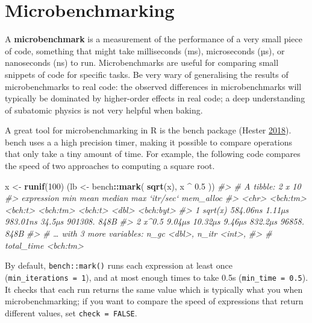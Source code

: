 \documentclass[]{book}
\newenvironment{Shaded}{\begin{snugshade}}{\end{snugshade}}
\newcommand{\CommentTok}[1]{\textcolor[rgb]{0.37,0.37,0.37}{\textit{#1}}}
\newcommand{\DecValTok}[1]{\textcolor[rgb]{0.06,0.06,0.06}{#1}}
\newcommand{\FloatTok}[1]{\textcolor[rgb]{0.06,0.06,0.06}{#1}}
\newcommand{\KeywordTok}[1]{\textcolor[rgb]{0.27,0.27,0.27}{\textbf{#1}}}
\newcommand{\NormalTok}[1]{#1}
\newcommand{\OperatorTok}[1]{\textcolor[rgb]{0.43,0.43,0.43}{\textbf{#1}}}
\newcommand{\StringTok}[1]{\textcolor[rgb]{0.5,0.5,0.5}{#1}}
\begin{document}
\hypertarget{microbenchmarking}{%
\section{Microbenchmarking}\label{microbenchmarking}}


A \textbf{microbenchmark} is a measurement of the performance of a very small piece of code, something that might take milliseconds (ms), microseconds (µs), or nanoseconds (ns) to run. Microbenchmarks are useful for comparing small snippets of code for specific tasks. Be very wary of generalising the results of microbenchmarks to real code: the observed differences in microbenchmarks will typically be dominated by higher-order effects in real code; a deep understanding of subatomic physics is not very helpful when baking.

A great tool for microbenchmarking in R is the bench package (Hester \protect\hyperlink{ref-bench}{2018}). bench uses a a high precision timer, making it possible to compare operations that only take a tiny amount of time. For example, the following code compares the speed of two approaches to computing a square root.

\begin{Shaded}
\begin{Highlighting}[]
\NormalTok{x <-}\StringTok{ }\KeywordTok{runif}\NormalTok{(}\DecValTok{100}\NormalTok{)}
\NormalTok{(lb <-}\StringTok{ }\NormalTok{bench}\OperatorTok{::}\KeywordTok{mark}\NormalTok{(}
  \KeywordTok{sqrt}\NormalTok{(x),}
\NormalTok{  x }\OperatorTok{^}\StringTok{ }\FloatTok{0.5}
\NormalTok{))}
\CommentTok{#> # A tibble: 2 x 10}
\CommentTok{#>   expression      min    mean   median     max `itr/sec` mem_alloc}
\CommentTok{#>   <chr>      <bch:tm> <bch:t> <bch:tm> <bch:t>     <dbl> <bch:byt>}
\CommentTok{#> 1 sqrt(x)    584.06ns  1.11µs 983.01ns  34.5µs   901308.      848B}
\CommentTok{#> 2 x^0.5        9.04µs 10.32µs   9.46µs 832.2µs    96858.      848B}
\CommentTok{#> # … with 3 more variables: n_gc <dbl>, n_itr <int>,}
\CommentTok{#> #   total_time <bch:tm>}
\end{Highlighting}
\end{Shaded}

By default, \texttt{bench::mark()} runs each expression at least once (\texttt{min\_iterations\ =\ 1}), and at most enough times to take 0.5s (\texttt{min\_time\ =\ 0.5}). It checks that each run returns the same value which is typically what you when microbenchmarking; if you want to compare the speed of expressions that return different values, set \texttt{check\ =\ FALSE}.
\end{document}
